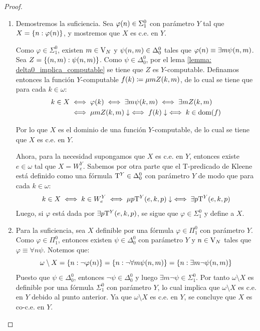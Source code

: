 \begin{proof}
	\begin{enumerate}
		\item Demostremos la suficiencia. Sea $\varphi\pa*{n}\in\Sigma_{1}^{0}$ con parámetro $Y$ tal que $X =\set*{n:\varphi\pa*{n}}$, y mostremos que $X$ es c.e. en $Y$.

		Como $\varphi\in\Sigma_{1}^{0}$, existen $m\in\VARIABLES[N]$ y $\psi\pa*{n, m}\in\Delta_{0}^{0}$ tales que $\varphi\pa*{n}\equiv\exists m\psi\pa*{n, m}$. Sea $Z =\set*{\pa*{n, m}:\psi\pa*{n, m}}$. Como $\psi\in\Delta_{0}^{0}$, por el lema \ref{lemma: delta0_implica_computable} se tiene que $Z$ es $Y$-computable. Definamos entonces la función $Y$-computable $f\pa*{k}\coloneqq\mu m Z\pa*{k, m}$, de lo cual se tiene que para cada $k\in\omega$:
		\begin{align*}
			k\in X&\iff\varphi\pa*{k}\iff\exists m\psi\pa*{k, m}\iff\exists m Z\pa*{k, m}\\
			&\iff\mu m Z\pa*{k, m}\ACABA\iff f\pa*{k}\ACABA\iff k\in\DOMINIO{f}
		\end{align*}

		Por lo que $X$ es el dominio de una función $Y$-computable, de lo cual se tiene que $X$ es c.e. en $Y$.

		Ahora, para la necesidad supongamos que $X$ es c.e. en $Y$, entonces existe $e\in\omega$ tal que $X = W_{e}^{Y}$. Sabemos por otra parte que el T-predicado de Kleene está definido como una fórmula $\KLEENE[Y]\in\Delta_{0}^{0}$ con parámetro $Y$ de modo que para cada $k\in\omega$:
		\[
			k\in X\iff k\in W_{e}^{Y}\iff\mu p\KLEENE[Y]\pa*{e, k, p}\ACABA\iff\exists p\KLEENE[Y]\pa*{e, k, p}
		\]
		Luego, si $\varphi$ está dada por $\exists p\KLEENE[Y]\pa*{e, k, p}$, se sigue que $\varphi\in\Sigma_{1}^{0}$ y define a $X$.
		\item Para la suficiencia, sea $X$ definible por una fórmula $\varphi\in\Pi_{1}^{0}$ con parámetro $Y$. Como $\varphi\in\Pi_{1}^{0}$, entonces existen $\psi\in\Delta_{0}^{0}$ con parámetro $Y$ y $n\in\VARIABLES[N]$ tales que $\varphi\equiv\forall n\psi$. Notemos que:
		\[
			\omega\setminus X =\set*{n:\neg\varphi\pa*{n}} =\set*{n:\neg\forall m\psi\pa*{n, m}} =\set*{n:\exists m\neg\psi\pa*{n, m}}
		\]
		Puesto que $\psi\in\Delta_{0}^{0}$, entonces $\neg\psi\in\Delta_{0}^{0}$ y luego $\exists m\neg\psi\in\Sigma_{1}^{0}$. Por tanto $\omega\setminus X$ es definible por una fórmula $\Sigma_{1}^{0}$ con parámetro $Y$, lo cual implica que $\omega\setminus X$ es c.e. en $Y$ debido al punto anterior. Ya que $\omega\setminus X$ es c.e. en $Y$, se concluye que $X$ es co-c.e. en $Y$.


\end{enumerate}
\end{proof}
